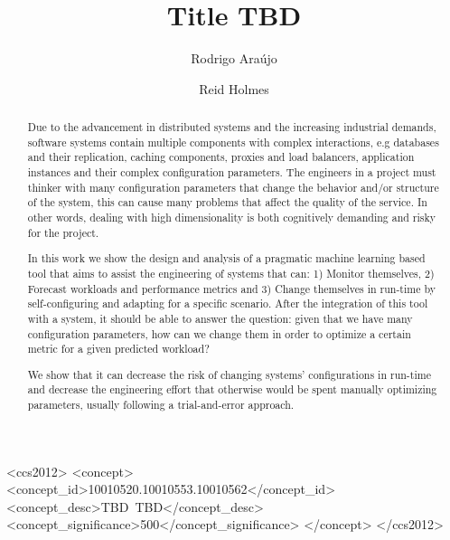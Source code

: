 \documentclass[sigconf]{acmart}
\begin{document}
\title{Title TBD}


\author{Rodrigo Araújo}

\author{Reid Holmes}

\renewcommand{\shortauthors}{B. Trovato et al.}


\begin{abstract}
Due to the advancement in distributed systems and the increasing industrial demands, software systems contain multiple components with complex interactions, e.g databases and their replication, caching components, proxies and load balancers, application instances and their complex configuration parameters. The engineers in a project must thinker with many configuration parameters that change the behavior and/or structure of the system, this can cause many problems that affect the quality of the service. In other words, dealing with high dimensionality is both cognitively demanding and risky for the project.

In this work we show the design and analysis of a pragmatic machine learning based tool that aims to assist the engineering of systems that can: 1) Monitor themselves, 2) Forecast workloads and performance metrics and 3) Change themselves in run-time by self-configuring and adapting for a specific scenario. After the integration of this tool with a system, it should be able to answer the question: given that we have many configuration parameters, how can we change them in order to optimize a certain metric for a given predicted workload?

We show that it can decrease the risk of changing systems' configurations in run-time and decrease the engineering effort that otherwise would be spent manually optimizing parameters, usually following a trial-and-error approach.

\end{abstract}

%
%
\begin{CCSXML}
<ccs2012>
 <concept>
  <concept_id>10010520.10010553.10010562</concept_id>
  <concept_desc>TBD~TBD</concept_desc>
  <concept_significance>500</concept_significance>
 </concept>
</ccs2012>  
\end{CCSXML}





\maketitle




 
\end{document}
